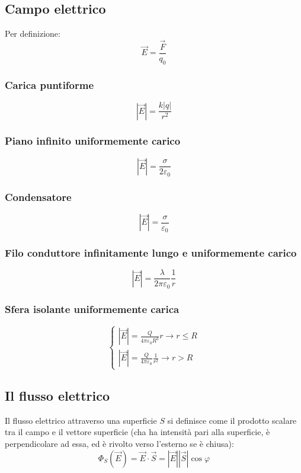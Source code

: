 \documentclass[12pt]{article}
\begin{document}
\subsection{Campo elettrico}
Per definizione:
$$ \vec{E} = \frac{\vec{F}}{q_0} $$

\subsubsection*{Carica puntiforme}
$$ |\vec{E}| = \frac{k|q|}{r^2} $$

\subsubsection*{Piano infinito uniformemente carico}
$$ |\vec{E}| = \frac{\sigma}{2\varepsilon_0} $$

\subsubsection*{Condensatore}
$$ |\vec{E}| = \frac{\sigma}{\varepsilon_0} $$

\subsubsection*{Filo conduttore infinitamente lungo e uniformemente carico}
$$ |\vec{E}| = \frac{\lambda}{2\pi\varepsilon_0} \frac{1}{r} $$

\subsubsection*{Sfera isolante uniformemente carica}
\begin{equation}
    \begin{cases}
        |\vec{E}| = \frac{Q}{4\pi\varepsilon_0 R^3}r \longrightarrow r \le R\\
        |\vec{E}| = \frac{Q}{4\pi\varepsilon_0} \frac{1}{r^2} \longrightarrow r > R
    \end{cases}
\end{equation}

\subsection{Il flusso elettrico}
Il flusso elettrico attraverso una superficie $S$ si definisce come il prodotto scalare tra il campo e il vettore superficie (cha ha intensità pari alla superficie, è perpendicolare ad essa, ed è rivolto verso l'esterno se è chiusa):
$$ \Phi_S(\vec{E}) = \vec{E} \cdot \vec{S} = |\vec{E}||\vec{S}|\cos{\varphi} $$
\end{document}
